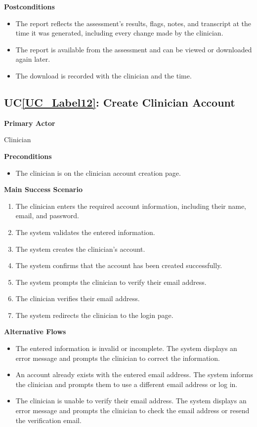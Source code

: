 \documentclass[12pt]{article}
\newcounter{ucnum} %
\newcommand{\ucref}[1]{UC\ref{#1}}
\begin{document}
\textbf{Postconditions}
\begin{itemize}
\item The report reflects the assessment’s results, flags, notes, and transcript at the time it was generated, including every change made by the clinician.
\item The report is available from the assessment and can be viewed or downloaded again later.
\item The download is recorded with the clinician and the time.
\end{itemize}

 \label{UC_Label12}

\subsection{\ucref{UC_Label12}: Create Clinician Account}

\textbf{Primary Actor}

Clinician

\textbf{Preconditions}

\begin{itemize}
\item The clinician is on the clinician account creation page.
\end{itemize}

\textbf{Main Success Scenario}

\begin{enumerate}
\item The clinician enters the required account information, including their name, email, and password.
\item The system validates the entered information.
\item The system creates the clinician's account.
\item The system confirms that the account has been created successfully.
\item The system prompts the clinician to verify their email address.
\item The clinician verifies their email address.
\item The system redirects the clinician to the login page.
\end{enumerate}

\textbf{Alternative Flows}

\begin{itemize}
\item[2a.] The entered information is invalid or incomplete. The system displays an error message and prompts the clinician to correct the information.
\item[2b.] An account already exists with the entered email address. The system informs the clinician and prompts them to use a different email address or log in.
\item[6a.] The clinician is unable to verify their email address. The system displays an error message and prompts the clinician to check the email address or resend the verification email.
\end{itemize}
\end{document}
